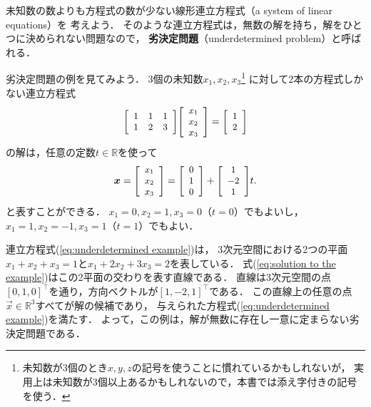 




未知数の数よりも方程式の数が少ない線形連立方程式（a system of linear equations）を
考えよう．
そのような連立方程式は，無数の解を持ち，解をひとつに決められない問題なので，
%
{\bf 劣決定問題}（underdetermined problem）と呼ばれる．

劣決定問題の例を見てみよう．
3個の未知数$x_1,x_2,x_3$\footnote{%
未知数が3個のとき$x,y,z$の記号を使うことに慣れているかもしれないが，
実用上は未知数が$3$個以上あるかもしれないので，本書では添え字付きの記号を使う．}%
に対して2本の方程式しかない連立方程式
\begin{equation}
\smatrix{\small}{rrr}
{1 & 1 & 1\\
1 & 2 & 3}
\smatrix{\small}{c}{x_1\\ x_2\\ x_3}
=
\smatrix{\small}{r}{1\\ 2}
\label{eq:underdetermined example}
\end{equation}
の解は，任意の定数$t\in\mathbb{R}$を使って
\begin{equation}
 \vec x=\smatrix{\small}{c}{x_1\\ x_2\\ x_3}
=\smatrix{\small}{c}{0\\ 1\\ 0}+\smatrix{\small}{c}{1\\ -2\\ 1}t.
\label{eq:solution to the example}
\end{equation}
と表すことができる．
$x_1=0,x_2=1,x_3=0$（$t=0$）でもよいし，$x_1=1,x_2=-1,x_3=1$（$t=1$）でもよい．

連立方程式(\ref{eq:underdetermined example})は，
3次元空間における2つの平面
$x_1+x_2+x_3=1$と$x_1+2x_2+3x_3=2$を表している．
式(\ref{eq:solution to the example})はこの2平面の交わりを表す直線である．
直線は3次元空間の点$[0,1,0]^\top$を通り，方向ベクトルが$[1,-2,1]^\top$である．
この直線上の任意の点$\vec x\in\mathbb{R}^3$すべてが解の候補であり，
与えられた方程式(\ref{eq:underdetermined example})を満たす．
よって，この例は，解が無数に存在し一意に定まらない劣決定問題である．

